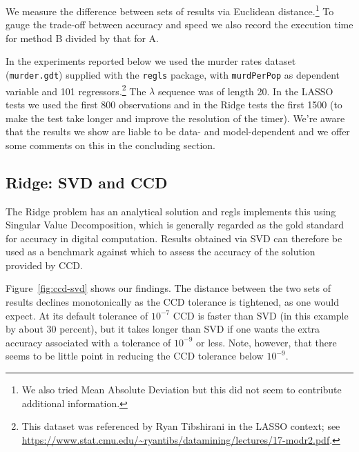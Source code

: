 \documentclass{article}
\begin{document}
We measure the difference between sets of results via Euclidean
distance.\footnote{We also tried Mean Absolute Deviation but this did
  not seem to contribute additional information.}  To gauge the
trade-off between accuracy and speed we also record the execution time
for method B divided by that for A.

In the experiments reported below we used the murder rates dataset
(\texttt{murder.gdt}) supplied with the \texttt{regls} package, with
\texttt{murdPerPop} as dependent variable and 101
regressors.\footnote{This dataset was referenced by Ryan Tibshirani in
  the LASSO context; see
  \url{https://www.stat.cmu.edu/~ryantibs/datamining/lectures/17-modr2.pdf}.}
The $\lambda$ sequence was of length 20. In the LASSO tests we used
the first 800 observations and in the Ridge tests the first 1500 (to
make the test take longer and improve the resolution of the
timer). We're aware that the results we show are liable to be data-
and model-dependent and we offer some comments on this in the
concluding section.

\subsection*{Ridge: SVD and CCD}

The Ridge problem has an analytical solution and \textsf{regls}
implements this using Singular Value Decomposition, which is generally
regarded as the gold standard for accuracy in digital
computation. Results obtained via SVD can therefore be used as a
benchmark against which to assess the accuracy of the solution
provided by CCD.

Figure~\ref{fig:ccd-svd} shows our findings. The distance between the
two sets of results declines monotonically as the CCD tolerance is
tightened, as one would expect. At its default tolerance of $10^{-7}$
CCD is faster than SVD (in this example by about 30 percent), but it
takes longer than SVD if one wants the extra accuracy associated with
a tolerance of $10^{-9}$ or less. Note, however, that there seems to
be little point in reducing the CCD tolerance below $10^{-9}$.
\end{document}
